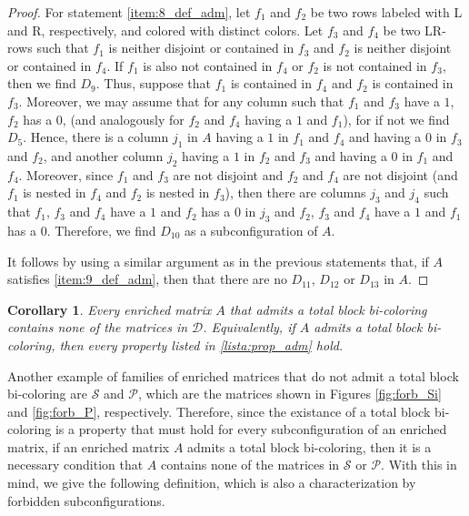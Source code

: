 \documentclass[12pt]{book}
\theoremstyle{plain}
\newtheorem{cor}[teo]{Corollary}
\theoremstyle{remark}
\begin{document}
\begin{proof}
For statement \ref{item:8_def_adm}, let $f_1$ and $f_2$ be two rows labeled with L and R, respectively, and colored with distinct colors. Let $f_3$ and $f_4$ be two LR-rows such that $f_1$ is neither disjoint or contained in $f_3$ and $f_2$ is neither disjoint or contained in $f_4$. 
If $f_1$ is also not contained in $f_4$ or $f_2$ is not contained in $f_3$, then we find $D_9$. Thus, suppose that $f_1$ is contained in $f_4$ and $f_2$ is contained in $f_3$. Moreover, we may assume that for any column such that $f_1$ and $f_3$ have a $1$, $f_2$ has a $0$, (and analogously for $f_2$ and $f_4$ having a $1$ and $f_1$), for if not we find $D_5$.
Hence, there is a column $j_1$ in $A$ having a $1$ in $f_1$ and $f_4$ and having a $0$ in $f_3$ and $f_2$, and another column $j_2$ having a $1$ in $f_2$ and $f_3$ and having a $0$ in $f_1$ and $f_4$. Moreover, since $f_1$ and $f_3$ are not disjoint and $f_2$ and $f_4$ are not disjoint (and $f_1$ is nested in $f_4$ and $f_2$ is nested in $f_3$), then there are columns $j_3$ and $j_4$ such that $f_1$, $f_3$ and $f_4$ have a $1$ and $f_2$ has a $0$ in $j_3$ and  $f_2$, $f_3$ and $f_4$ have a $1$ and $f_1$ has a $0$. Therefore, we find $D_{10}$ as a subconfiguration of $A$.

It follows by using a similar argument as in the previous statements that, if $A$ satisfies \ref{item:9_def_adm}, then that there are no $D_{11}$, $D_{12}$ or $D_{13}$ in $A$.

\end{proof}


\begin{cor}
Every enriched matrix $A$ that admits a total block bi-coloring contains none of the matrices in $\mathcal{D}$. Equivalently, if $A$ admits a total block bi-coloring, then every property listed in \ref{lista:prop_adm} hold. 
\end{cor}

Another example of families of enriched matrices that do not admit a total block bi-coloring are $\mathcal{S}$ and $\mathcal{P}$, which are the matrices shown in Figures \ref{fig:forb_Si} and \ref{fig:forb_P}, respectively.
Therefore, since the existance of a total block bi-coloring is a property that must hold for every subconfiguration of an enriched matrix, if an enriched matrix $A$ admits a total block bi-coloring, then it is a necessary condition that $A$ contains none of the matrices in $\mathcal{S}$ or $\mathcal{P}$. 
With this in mind, we give the following definition, which is also a characterization by forbidden subconfigurations.
\end{document}
